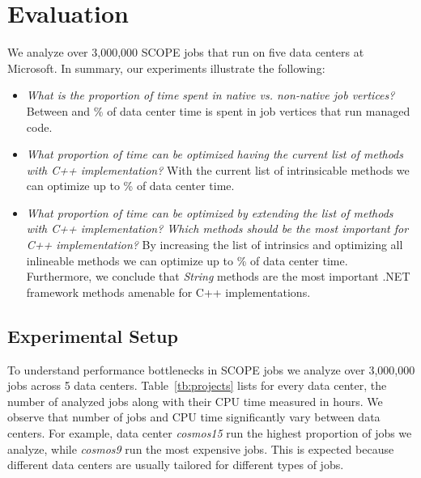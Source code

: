 \section{Evaluation}
We analyze over 3,000,000 SCOPE jobs that run on five data centers at Microsoft. In summary, our experiments illustrate the following:

\begin{itemize}
\item \emph{What is the proportion of time spent in native vs. non-native job vertices?} Between \nonNativeTimeL{} and \nonNativeTimeU \% of data center time is spent in job vertices that run managed code.

\item \emph{What proportion of time can be optimized having the current list of methods with C++ implementation?} With the current list of intrinsicable methods we can optimize up to \optimizableU{} \% of data center time.

\item \emph{What proportion of time can be optimized by extending the list of methods with C++ implementation? Which methods should be the most important for C++ implementation?}
By increasing the list of intrinsics and optimizing all inlineable methods we can optimize up to \potentiallyOptimizableU{} \% of data center time. Furthermore, we conclude that \emph{String} methods are the most important .NET framework methods amenable for C++ implementations.


\end{itemize}

\subsection{Experimental Setup}
To understand performance bottlenecks in SCOPE jobs we analyze over 3,000,000 jobs across 5 data centers. Table~\ref{tb:projects} lists for every data center, the number of analyzed jobs along with their CPU time measured in hours. We observe that number of jobs and CPU time significantly vary between data centers. For example, data center \emph{cosmos15} run the highest proportion of jobs we analyze, while \emph{cosmos9} run the most expensive jobs. This is expected because different data centers are usually tailored for different types of jobs. 


